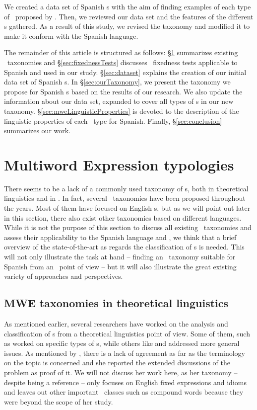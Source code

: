 \documentclass[output=paper]{langsci/langscibook}
\begin{document}
We created a data set of  Spanish \mwe s with the aim of finding examples of each type of \mwe\ proposed by \citet{Ramisch:2012,Ramisch:2015}. 
Then, we reviewed our data set and the features of the different \mwe s gathered.
As a result of this study, we revised the taxonomy and modified it to make it conform with the Spanish language.

The remainder of this article is structured as follows: §\ref{sec:mwe_typologies} summarizes existing \mwe\ taxonomies and §\ref{sec:fixednessTests} discusses \mwe\ fixedness tests applicable to Spanish and used in our study. 
§\ref{sec:dataset} explains the creation of our initial data set of Spanish \mwe s. 
In §\ref{sec:ourTaxonomy}, we present the taxonomy we propose for Spanish \mwe s based on the results of our research. 
We also update the information about our data set, expanded to cover all types of \mwe s in our new taxonomy. 
§\ref{sec:mweLinguisticProperties} is devoted to the description of the linguistic properties of each \mwe\ type for Spanish.
Finally, §\ref{sec:conclusion} summarizes our work.

\section{Multiword Expression typologies}
\label{sec:mwe_typologies}

There seems to be a lack of a commonly used taxonomy of \mwe s, both in theoretical linguistics and in \nlp.
In fact, several \mwe\ taxonomies have been proposed throughout the years. 
Most of them have focused on English \mwe s, but as we will point out later in this section, there also exist other taxonomies based on different languages.
While it is not the purpose of this section to discuss all existing \mwe\ taxonomies and assess their applicability to the Spanish language and \nlp , we think that a brief overview of the state-of-the-art as regards the classification of \mwe s is needed.
This will not only illustrate the task at hand -- finding an \mwe\ taxonomy suitable for Spanish from an \nlp\ point of view -- but it will also illustrate the great existing variety of approaches and perspectives.

\subsection{MWE taxonomies in theoretical linguistics}
\label{ssec:taxonomies_theoreticalLinguistics}

As mentioned earlier, several researchers have worked on the analysis and classification of \mwe s from a theoretical linguistics point of view.
Some of them, such as \citet{moon1998} worked on specific types of \mwe s, while others like \citet{Melcuk:1995} and \citet{FillmoreEtAl1988} addressed more general issues.
As mentioned by \citet{moon1998}, there is a lack of agreement as far as the terminology on the topic is concerned and she reported the extended discussions of the problem as proof of it.
We will not discuss her work here, as her taxonomy -- despite being a reference -- only focuses on English fixed expressions and idioms and leaves out other important \mwe\ classes such as compound words because they were beyond the scope of her study.
\end{document}
